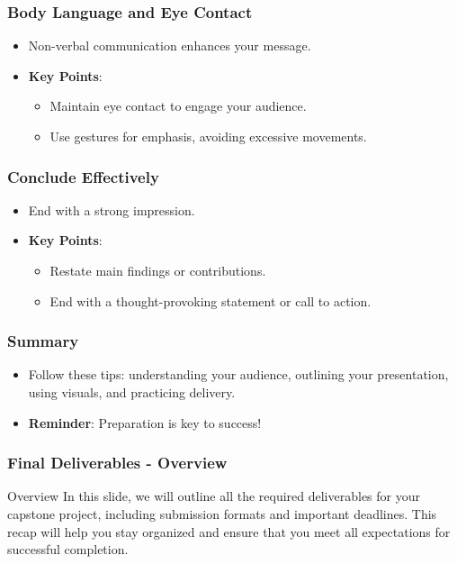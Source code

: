 \documentclass[aspectratio=169]{beamer}
\begin{document}
\begin{frame}[fragile]
    \frametitle{Body Language and Eye Contact}
    \begin{itemize}
        \item Non-verbal communication enhances your message.
        \item \textbf{Key Points}:
            \begin{itemize}
                \item Maintain eye contact to engage your audience.
                \item Use gestures for emphasis, avoiding excessive movements.
            \end{itemize}
    \end{itemize}
\end{frame}

\begin{frame}[fragile]
    \frametitle{Conclude Effectively}
    \begin{itemize}
        \item End with a strong impression.
        \item \textbf{Key Points}:
            \begin{itemize}
                \item Restate main findings or contributions.
                \item End with a thought-provoking statement or call to action.
            \end{itemize}
    \end{itemize}
\end{frame}

\begin{frame}[fragile]
    \frametitle{Summary}
    \begin{itemize}
        \item Follow these tips: understanding your audience, outlining your presentation, using visuals, and practicing delivery.
        \item \textbf{Reminder}: Preparation is key to success!
    \end{itemize}
\end{frame}

\begin{frame}[fragile]
    \frametitle{Final Deliverables - Overview}
    \begin{block}{Overview}
        In this slide, we will outline all the required deliverables for your capstone project, including submission formats and important deadlines. 
        This recap will help you stay organized and ensure that you meet all expectations for successful completion.
    \end{block}
\end{frame}
\end{document}
